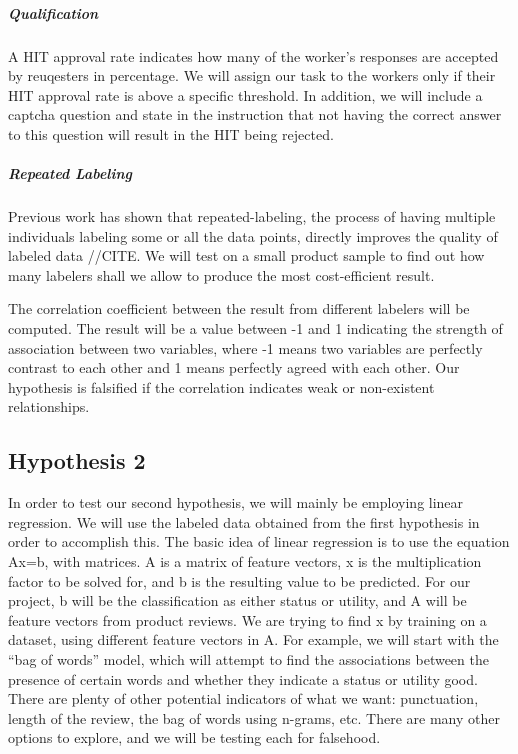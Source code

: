 \documentclass[dvips,12pt]{article}
\begin{document}
 \subparagraph{Qualification}
	 A HIT approval rate indicates how many of the worker’s responses are accepted by reuqesters in percentage. We will assign our task to the workers only if their HIT approval rate is above a specific threshold. In addition, we will include a captcha question and state in the instruction that not having the correct answer to this question will result in the HIT being rejected.
	 
\subparagraph{Repeated Labeling}
	 Previous work has shown that repeated-labeling, the process of having multiple individuals labeling some or all the data points, directly improves the quality of labeled data //CITE. We will test on a small product sample to find out how many labelers shall we allow to produce the most cost-efficient result.\newline
	 
\noindent The correlation coefficient between the result from different labelers will be computed. The result will be a value between -1 and 1 indicating the strength of association between two variables, where -1 means two variables are perfectly contrast to each other and 1 means perfectly agreed with each other. Our hypothesis is falsified if the correlation indicates weak or non-existent relationships.


	


\subsection{Hypothesis 2}
In order to test our second hypothesis, we will mainly be employing linear regression. We will use the labeled data obtained from the first hypothesis in order to accomplish this. The basic idea of linear regression is to use the equation Ax=b, with matrices. A is a matrix of feature vectors, x is the multiplication factor to be solved for, and b is the resulting value to be predicted. For our project, b will be the classification as either status or utility, and A will be feature vectors from product reviews. We are trying to find x by training on a dataset, using different feature vectors in A. For example, we will start with the “bag of words” model, which will attempt to find the associations between the presence of certain words and whether they indicate a status or utility good. There are plenty of other potential indicators of what we want: punctuation, length of the review, the bag of words using n-grams, etc. There are many other options to explore, and we will be testing each for falsehood. \newline
\end{document}
